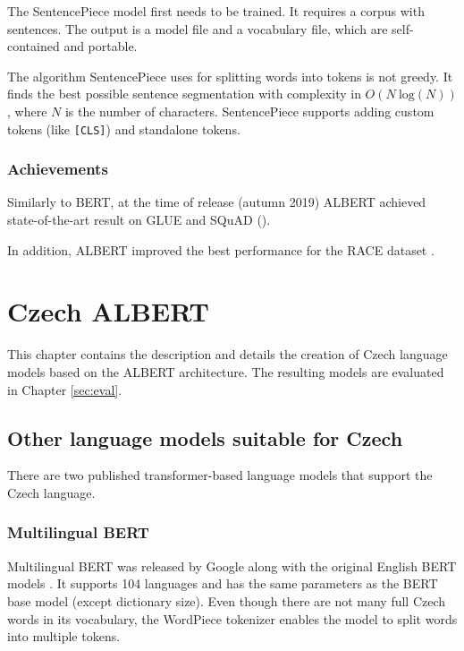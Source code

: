 \documentclass[
  printed, %
  color,   %
  table,   %
  oneside, %
  lof,     %
  lot,     %
]{fithesis3}
\begin{document}
The SentencePiece model first needs to be trained. It requires a corpus with sentences. The output is a model file and a vocabulary file, which are self-contained and portable.

The algorithm SentencePiece uses for splitting words into tokens is not greedy. It finds the best possible sentence segmentation with complexity in $O(N \  \text{log}(N))$, where $N$ is the number of characters. SentencePiece supports adding custom tokens (like \texttt{[CLS]}) and standalone tokens.


\subsection{Achievements}

Similarly to BERT, at the time of release (autumn 2019) ALBERT achieved state-of-the-art result on GLUE \parencite{glue} and SQuAD \parencite{squad} (\parencite[Tables 9 and 10]{albert}).

In addition, ALBERT improved the best performance for the RACE dataset \parencite{race}.



\chapter{Czech ALBERT}
This chapter contains the description and details the creation of Czech language models based on the ALBERT architecture. The resulting models are evaluated in Chapter \ref{sec:eval}.

\section{Other language models suitable for Czech}
\label{chap:multimodels}
There are two published transformer-based language models that support the Czech language. 

\subsection{Multilingual BERT}
Multilingual BERT was released by Google along with the original English BERT models \parencite{multibert}. It supports 104 languages and has the same parameters as the BERT base model (except dictionary size). Even though there are not many full Czech words in its vocabulary, the WordPiece tokenizer enables the model to split words into multiple tokens.
\end{document}
